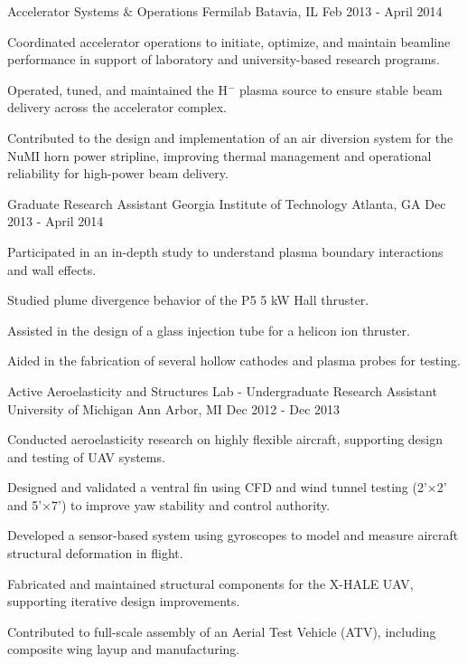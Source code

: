 \begin{cventries}
\cventry
{Accelerator Systems \& Operations}
{Fermilab}
{Batavia, IL}
{Feb 2013 - April 2014}
{
\begin{cvitems}
\item {Coordinated accelerator operations to initiate, optimize, and maintain beamline performance in support of laboratory and university-based research programs.}
\item {Operated, tuned, and maintained the H$^-$ plasma source to ensure stable beam delivery across the accelerator complex.}
\item {Contributed to the design and implementation of an air diversion system for the NuMI horn power stripline, improving thermal management and operational reliability for high-power beam delivery.}
\end{cvitems}
}
\vspace{6mm}
\cventry
{Graduate Research Assistant}
{Georgia Institute of Technology}
{Atlanta, GA}
{Dec 2013 - April 2014}
{
\begin{cvitems}
\item {Participated in an in-depth study to understand plasma boundary interactions and wall effects.}
\item {Studied plume divergence behavior of the P5 5 kW Hall thruster.}
\item {Assisted in the design of a glass injection tube for a helicon ion thruster.}
\item {Aided in the fabrication of several hollow cathodes and plasma probes for testing.}
\end{cvitems}
}
\vspace{6mm}
\cventry
{Active Aeroelasticity and Structures Lab - Undergraduate Research Assistant}
{University of Michigan}
{Ann Arbor, MI}
{Dec 2012 - Dec 2013}
{
\begin{cvitems}
\item {Conducted aeroelasticity research on highly flexible aircraft, supporting design and testing of UAV systems.}
\item {Designed and validated a ventral fin using CFD and wind tunnel testing (2'×2' and 5'×7') to improve yaw stability and control authority.}
\item {Developed a sensor-based system using gyroscopes to model and measure aircraft structural deformation in flight.}
\item {Fabricated and maintained structural components for the X-HALE UAV, supporting iterative design improvements.}
\item {Contributed to full-scale assembly of an Aerial Test Vehicle (ATV), including composite wing layup and manufacturing.}
\end{cvitems}
}
\end{cventries}